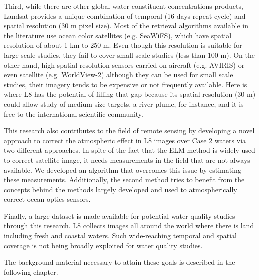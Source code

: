Third, while there are other global water constituent concentrations products, Landsat provides a unique combination of temporal (16 days repeat cycle) and spatial resolution (30 m pixel size). Most of the retrieval algorithms available in the literature use ocean color satellites (e.g. SeaWiFS), which have spatial resolution of about 1 km to 250 m. Even though this resolution is suitable for large scale studies, they fail to cover small scale studies (less than 100 m). On the other hand, high spatial resolution sensors carried on aircraft (e.g. AVIRIS) or even satellite (e.g. WorldView-2) although they can be used for small scale studies, their imagery tends to be expensive or not frequently available. Here is where L8 has the potential of filling that gap because its spatial resolution (30 m) could allow study of medium size targets, a river plume, for instance, and it is free to the international scientific community.

This research also contributes to the field of remote sensing by developing a novel approach to correct the atmospheric effect in L8 images over Case 2 waters via two different approaches. In spite of the fact that the ELM method is widely used to correct satellite image, it needs measurements in the field that are not always available. We developed an algorithm that overcomes this issue by estimating these measurements. Additionally, the { \color{red} second method} tries to benefit from the concepts behind the methods largely developed and used to atmospherically correct ocean optics sensors.

Finally, a large dataset is made available for potential water quality studies through this research. L8 collects images all around the world where there is land including fresh and coastal waters. Such wide-reaching temporal and spatial coverage is not being broadly exploited for water quality studies.

The background material necessary to attain these goals is described in the following chapter.
